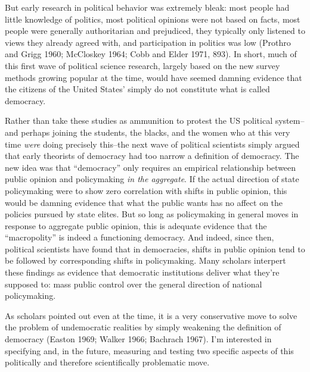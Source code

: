 \documentclass[12pt,book]{article}
\begin{document}
But early research in political behavior was extremely bleak: most
people had little knowledge of politics, most political opinions were
not based on facts, most people were generally authoritarian and
prejudiced, they typically only listened to views they already agreed
with, and participation in politics was low (Prothro and Grigg 1960;
McCloskey 1964; Cobb and Elder 1971, 893). In short, much of this first
wave of political science research, largely based on the new survey
methods growing popular at the time, would have seemed damning evidence
that the citizens of the United States' simply do not constitute what is
called democracy.

Rather than take these studies as ammunition to protest the US political
system--and perhaps joining the students, the blacks, and the women who
at this very time \emph{were} doing precisely this--the next wave of
political scientists simply argued that early theorists of democracy had
too narrow a definition of democracy. The new idea was that
``democracy'' only requires an empirical relationship between public
opinion and policymaking \emph{in the aggregate}. If the actual
direction of state policymaking were to show zero correlation with
shifts in public opinion, this would be damning evidence that what the
public wants has no affect on the policies pursued by state elites. But
so long as policymaking in general moves in response to aggregate public
opinion, this is adequate evidence that the ``macropolity'' is indeed a
functioning democracy. And indeed, since then, political scientists have
found that in democracies, shifts in public opinion tend to be followed
by corresponding shifts in policymaking. Many scholars interpert these
findings as evidence that democratic institutions deliver what they're
supposed to: mass public control over the general direction of national
policymaking.

As scholars pointed out even at the time, it is a very conservative move
to solve the problem of undemocratic realities by simply weakening the
definition of democracy (Easton 1969; Walker 1966; Bachrach 1967). I'm
interested in specifying and, in the future, measuring and testing two
specific aspects of this politically and therefore scientifically
problematic move.
\end{document}
